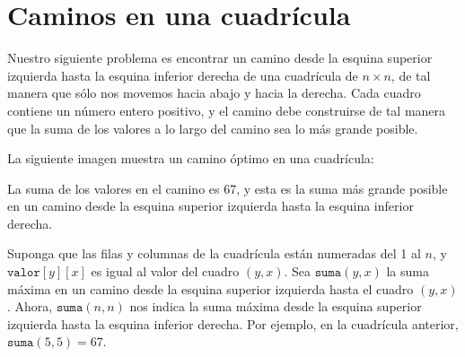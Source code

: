 \section{Caminos en una cuadrícula}

Nuestro siguiente problema es encontrar un camino
desde la esquina superior izquierda hasta
la esquina inferior derecha
de una cuadrícula de $n \times n$, de tal manera que
sólo nos movemos hacia abajo y hacia la derecha.
Cada cuadro contiene un número entero positivo,
y el camino debe construirse de tal manera que
la suma de los valores a lo largo
del camino sea lo más grande posible.

La siguiente imagen muestra un camino óptimo
en una cuadrícula:
\begin{center}
\end{center}
La suma de los valores en el camino es 67,
y esta es la suma más grande posible en un camino
desde la esquina
superior izquierda hasta la esquina inferior derecha.

Suponga que las filas y columnas de la
cuadrícula están numeradas del 1 al $n$,
y $\texttt{valor}[y][x]$ es igual al valor
del cuadro $(y,x)$.
Sea $\texttt{suma}(y,x)$ la suma máxima
en un camino desde la esquina superior izquierda
hasta el cuadro $(y,x)$.
Ahora, $\texttt{suma}(n,n)$ nos indica
la suma máxima
desde la esquina superior izquierda hasta
la esquina inferior derecha.
Por ejemplo, en la cuadrícula anterior,
$\texttt{suma}(5,5)=67$.

